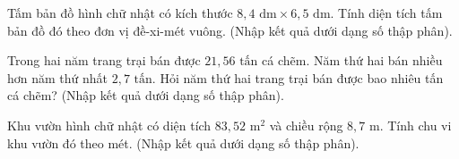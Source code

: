 \begin{ex} %
Tấm bản đồ hình chữ nhật có kích thước $8{,}4\text{ dm} \times 6{,}5\text{ dm}$. Tính diện tích tấm bản đồ đó theo đơn vị đề-xi-mét vuông. (Nhập kết quả dưới dạng số thập phân).
\end{ex}

\begin{ex} %
Trong hai năm trang trại bán được $21{,}56\text{ tấn}$ cá chẽm. Năm thứ hai bán nhiều hơn năm thứ nhất $2{,}7\text{ tấn}$. Hỏi năm thứ hai trang trại bán được bao nhiêu tấn cá chẽm? (Nhập kết quả dưới dạng số thập phân).
\end{ex}

\begin{ex} %
Khu vườn hình chữ nhật có diện tích $83{,}52\text{ m}^2$ và chiều rộng $8{,}7\text{ m}$. Tính chu vi khu vườn đó theo mét. (Nhập kết quả dưới dạng số thập phân).
\end{ex}
